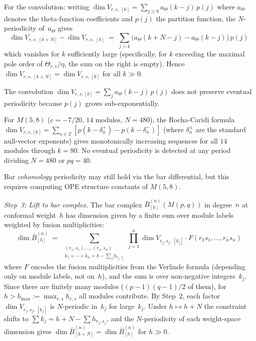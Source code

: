 \begin{evidence}
For the convolution: writing $\dim V_{r,s,\,[k]} = \sum_{j \geq 0} a_\Theta(k-j)\, p(j)$
where $a_\Theta$ denotes the theta-function coefficients and $p(j)$ the
partition function, the $N$-periodicity of~$a_\Theta$ gives
\[
\dim V_{r,s,\,[k+N]} - \dim V_{r,s,\,[k]}
\;=\; \sum_{j > k} \bigl(a_\Theta(k + N - j) - a_\Theta(k - j)\bigr)\, p(j)
\]
which vanishes for $k$ sufficiently large (specifically, for $k$ exceeding
the maximal pole order of $\Theta_{r,s}/\eta$, the sum on the right is empty).
Hence $\dim V_{r,s,\,[k+N]} = \dim V_{r,s,\,[k]}$ for all $k \gg 0$.

\begin{remark}
\label{rem:step2-stabilization-threshold}
The convolution $\dim V_{r,s,[k]} = \sum_j a_\Theta(k-j)\, p(j)$ does not preserve eventual periodicity because $p(j)$ grows sub-exponentially.

\begin{computation}
\label{comp:m58-weight-space-periodicity}
For $M(5,8)$ ($c = -7/20$, $14$ modules, $N = 480$), the Rocha-Caridi formula
$\dim V_{r,s,[k]} = \sum_{n \in \mathbb{Z}} [p(k - \delta^+_n) - p(k - \delta^-_n)]$
(where $\delta^\pm_n$ are the standard null-vector exponents)
gives monotonically increasing sequences for all $14$ modules through $k = 80$.  No eventual periodicity is detected at any period dividing $N = 480$ or $pq = 40$.
\end{computation}

Bar \emph{cohomology} periodicity may still hold via the bar differential, but this requires computing OPE structure constants of $M(5,8)$.
\end{remark}

\emph{Step~3: Lift to bar complex.}
The bar complex $\bar{B}^{(n)}_{[h]}(M(p,q))$ in degree~$n$ at conformal
weight~$h$ has dimension given by a finite sum over module labels weighted
by fusion multiplicities:
\[
\dim \bar{B}^{(n)}_{[h]} \;=\; \sum_{\substack{(r_1,s_1),\ldots,(r_n,s_n) \\
k_1 + \cdots + k_n = h - \sum_j h_{r_j,s_j}}}
\prod_{j=1}^n \dim V_{r_j,s_j,\,[k_j]}
\cdot F(r_1 s_1, \ldots, r_n s_n)
\]
where $F$ encodes the fusion multiplicities from the Verlinde formula
(depending only on module labels, not on~$h$), and the sum is over
non-negative integers~$k_j$.  Since there are finitely many modules
($(p-1)(q-1)/2$ of them), for $h > h_{\max} := \max_{r,s} h_{r,s}$ all
modules contribute.  By Step~2, each factor $\dim V_{r_j,s_j,\,[k_j]}$
is $N$-periodic in~$k_j$ for large~$k_j$.  Under $h \mapsto h + N$ the
constraint shifts to $\sum k_j = h + N - \sum h_{r_j,s_j}$, and the
$N$-periodicity of each weight-space dimension gives
$\dim \bar{B}^{(n)}_{[h+N]} = \dim \bar{B}^{(n)}_{[h]}$ for $h \gg 0$.


\end{evidence}
